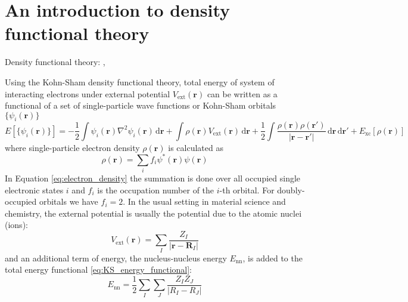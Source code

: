 \chapter{An introduction to density functional theory}

Density functional theory: \cite{Hohenberg1964,Kohn1965},

Using the Kohn-Sham density functional theory, total energy of system of interacting electrons
under external potential $V_{\mathrm{ext}}(\mathbf{r})$ can be written as a functional of
a set of single-particle wave functions or Kohn-Sham orbitals $\{\psi_{i}(\mathbf{r})\}$
\begin{equation}
E\left[\{\psi_{i}(\mathbf{r})\}\right] =
-\frac{1}{2} \int \psi_{i}(\mathbf{r}) \nabla^{2} \psi_{i}(\mathbf{r})\,\mathrm{d}\mathbf{r} +
\int \rho(\mathbf{r}) V_{\mathrm{ext}}(\mathbf{r})\,\mathrm{d}\mathbf{r} +
\frac{1}{2}\int
\frac{\rho(\mathbf{r}) \rho(\mathbf{r}')}{\left|\mathbf{r}-\mathbf{r}'\right|}\,
\mathrm{d}\mathbf{r}\,\mathrm{d}\mathbf{r}' + E_{\mathrm{xc}}\left[\rho(\mathbf{r})\right]
\label{eq:KS_energy_functional}
\end{equation}
%
where single-particle electron density $\rho(\mathbf{r})$ is calculated as
%
\begin{equation}
\rho(\mathbf{r}) = \sum_{i} f_{i} \psi^{*}(\mathbf{r}) \psi(\mathbf{r})
\label{eq:electron_density}
\end{equation}
%
In Equation \ref{eq:electron_density} the summation is done over
all occupied single electronic states $i$ and $f_{i}$
is the occupation number of the $i$-th orbital. For doubly-occupied orbitals
we have $f_{i}=2$.
In the usual setting in material science and chemistry, the external potential
is usually the potential due to the atomic nuclei (ions):
\begin{equation}
V_{\mathrm{ext}}(\mathbf{r}) = \sum_{I} \frac{Z_{I}}{\left|\mathbf{r} - \mathbf{R}_{I}\right|}
\end{equation}
and an additional term of energy, the nucleus-nucleus energy $E_{\mathrm{nn}}$,
is added to the total energy functional \eqref{eq:KS_energy_functional}:
\begin{equation}
E_{\mathrm{nn}} = \frac{1}{2} \sum_{I}\sum_{J}\frac{Z_{I} Z_{J}}{\left| R_{I} - R_{J} \right|}
\end{equation}

